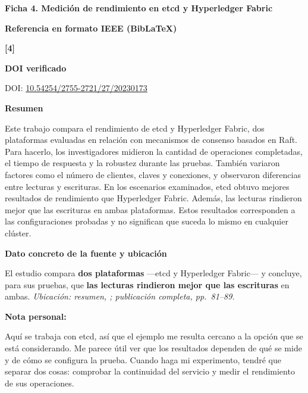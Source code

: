 \documentclass[11pt,letterpaper]{article}
\newcommand{\ficha}[2]{\begin{center}\large\bfseries Ficha #1. #2\end{center}\vspace{0.4em}}
\newcommand{\campo}[1]{\par\vspace{0.45em}\noindent\textbf{#1}\par}
\begin{document}
\clearpage
\ficha{4}{Medición de rendimiento en etcd y Hyperledger Fabric}
\campo{Referencia en formato IEEE (BibLaTeX)}
\textbf{[4]}\enspace {}
\campo{DOI verificado}
DOI: \href{https://doi.org/10.54254/2755-2721/27/20230173}{10.54254/2755-2721/27/20230173}
\campo{Resumen}
Este trabajo compara el rendimiento de etcd y Hyperledger Fabric, dos plataformas evaluadas en relación con mecanismos de consenso basados en Raft. Para hacerlo, los investigadores midieron la cantidad de operaciones completadas, el tiempo de respuesta y la robustez durante las pruebas. También variaron factores como el número de clientes, claves y conexiones, y observaron diferencias entre lecturas y escrituras. En los escenarios examinados, etcd obtuvo mejores resultados de rendimiento que Hyperledger Fabric. Además, las lecturas rindieron mejor que las escrituras en ambas plataformas. Estos resultados corresponden a las configuraciones probadas y no significan que suceda lo mismo en cualquier clúster.
\campo{Dato concreto de la fuente y ubicación}
El estudio compara \textbf{dos plataformas} ---etcd y Hyperledger Fabric--- y concluye, para sus pruebas, que \textbf{las lecturas rindieron mejor que las escrituras} en ambas. \textit{Ubicación: resumen, \cite[p.~81]{xiao2023raft}; publicación completa, pp.~81--89.}
\campo{Nota personal: }
Aquí se trabaja con etcd, así que el ejemplo me resulta cercano a la opción que se está considerando. Me parece útil ver que los resultados dependen de qué se mide y de cómo se configura la prueba. Cuando haga mi experimento, tendré que separar dos cosas: comprobar la continuidad del servicio y medir el rendimiento de sus operaciones.
\end{document}
